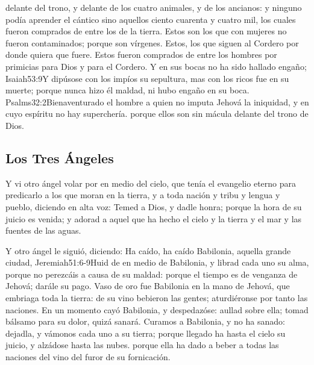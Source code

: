  delante del trono, y delante de los cuatro animales, y de los ancianos: y ninguno podía aprender el cántico sino aquellos ciento cuarenta y cuatro mil, los cuales fueron comprados de entre los de la tierra. 
Estos son los que con mujeres no fueron contaminados; porque son vírgenes. Estos, los que siguen al Cordero por donde quiera que fuere. Estos fueron comprados de entre los hombres por primicias para Dios y para el Cordero. 
Y en sus bocas no ha sido hallado engaño;%
				   {Isaiah}{53:9}{Y dipúsose con los impíos su sepultura, mas con los ricos fue en su muerte; porque nunca hizo él maldad, ni hubo engaño en su boca.}%
				   {Psalms}{32:2}{Bienaventurado el hombre a quien no imputa Jehová la iniquidad, y en cuyo espíritu no hay superchería.}
 porque ellos son sin mácula delante del trono de Dios.
\subsection*{Los Tres Ángeles}
Y vi otro ángel volar por en medio del cielo, que tenía el evangelio eterno para predicarlo a los que moran en la tierra, y a toda nación y tribu y lengua y pueblo, 
diciendo en alta voz: Temed a Dios, y dadle honra; porque la hora de su juicio es venida; y adorad a aquel que ha hecho el cielo y la tierra y el mar y las fuentes de las aguas.

Y otro ángel le siguió, diciendo: Ha caído, ha caído Babilonia, aquella grande ciudad,%
				  {Jeremiah}{51:6-9}{Huid de en medio de Babilonia, y librad cada uno su alma, porque no perezcáis a causa de su maldad: porque el tiempo es de venganza de Jehová; darále su pago. Vaso de oro fue Babilonia en la mano de Jehová, que embriaga toda la tierra: de su vino bebieron las gentes; aturdiéronse por tanto las naciones. En un momento cayó Babilonia, y despedazóse: aullad sobre ella; tomad bálsamo para su dolor, quizá sanará. Curamos a Babilonia, y no ha sanado: dejadla, y vámonos cada uno a su tierra; porque llegado ha hasta el cielo su juicio, y alzádose hasta las nubes.}
 porque ella ha dado a beber a todas las naciones del vino del furor de su fornicación.

